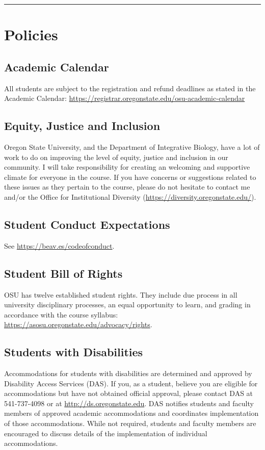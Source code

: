 \documentclass[10pt]{article}
\begin{document}
\noindent\rule[0.5ex]{\linewidth}{1pt}


\section*{Policies}
\small

\subsection*{Academic Calendar}
\noindent
All students are subject to the registration and refund deadlines as stated in the Academic Calendar: 
\url{https://registrar.oregonstate.edu/osu-academic-calendar}

\subsection*{Equity, Justice and Inclusion}
\noindent
Oregon State University, and the Department of Integrative Biology, have a lot 
of work to do on improving the level of equity, justice and inclusion in our 
community. 
I will take responsibility for creating an welcoming and supportive climate for 
everyone in the course. 
If you have concerns or suggestions related to these issues as they pertain to 
the course, please do not hesitate to contact me and/or the Office for 
Institutional Diversity
(\href{https://diversity.oregonstate.edu/}{https://diversity.oregonstate.edu/}).

\subsection*{Student Conduct Expectations}
\noindent
See \href{https://beav.es/codeofconduct}{https://beav.es/codeofconduct}.


\subsection*{Student Bill of Rights}
\noindent
OSU has twelve established student rights. They include due process in all university disciplinary 
processes, an equal opportunity to learn, and grading in accordance with the course syllabus:
\href{https://asosu.oregonstate.edu/advocacy/rights}{https://asosu.oregonstate.edu/advocacy/rights}.


\subsection*{Students with Disabilities}
\noindent
Accommodations for students with disabilities are determined and approved by 
Disability Access Services (DAS).
If you, as a student, believe you are eligible for accommodations but have not 
obtained official approval, please contact DAS at 541-737-4098 or at
\href{http://ds.oregonstate.edu}{http://ds.oregonstate.edu}.
DAS notifies students and faculty members of approved academic 
accommodations and coordinates implementation of those accommodations.
While not required, students and faculty members are encouraged to discuss 
details of the implementation of individual accommodations.
\end{document}
